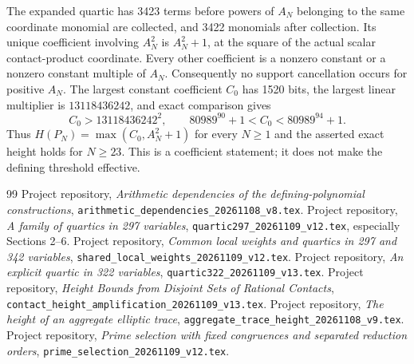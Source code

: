 \documentclass[11pt,a4paper]{article}
\begin{document}
The expanded quartic has 3423 terms before powers of $A_N$ belonging
to the same coordinate monomial are collected, and 3422 monomials
after collection. Its unique coefficient involving $A_N^2$ is
$A_N^2+1$, at the square of the actual scalar contact-product coordinate.
Every other coefficient is a nonzero constant or a nonzero constant
multiple of $A_N$. Consequently no support cancellation occurs for
positive $A_N$. The largest constant coefficient $C_0$ has 1520 bits,
the largest linear multiplier is $13118436242$, and exact comparison
gives
\[
 C_0>13118436242^2,\qquad
 80989^{90}+1<C_0<80989^{94}+1.
\]
Thus $H(P_N)=\max(C_0,A_N^2+1)$ for every $N\ge1$ and the asserted
exact height holds for $N\ge23$. This is a coefficient statement;
it does not make the defining threshold effective.

\begin{thebibliography}{99}\small\setlength{\itemsep}{2pt}
 Project repository,
\emph{Arithmetic dependencies of the defining-polynomial constructions},
\nolinkurl{arithmetic_dependencies_20261108_v8.tex}.
 Project repository,
\emph{A family of quartics in 297 variables},
\nolinkurl{quartic297_20261109_v12.tex}, especially Sections 2--6.
 Project repository,
\emph{Common local weights and quartics in 297 and 342 variables},
\nolinkurl{shared_local_weights_20261109_v12.tex}.
 Project repository,
\emph{An explicit quartic in 322 variables},
\nolinkurl{quartic322_20261109_v13.tex}.
 Project repository,
\emph{Height Bounds from Disjoint Sets of Rational Contacts},
\nolinkurl{contact_height_amplification_20261109_v13.tex}.
 Project repository,
\emph{The height of an aggregate elliptic trace},
\nolinkurl{aggregate_trace_height_20261108_v9.tex}.
 Project repository,
\emph{Prime selection with fixed congruences and separated reduction orders},
\nolinkurl{prime_selection_20261109_v12.tex}.
\end{thebibliography}
\end{document}

